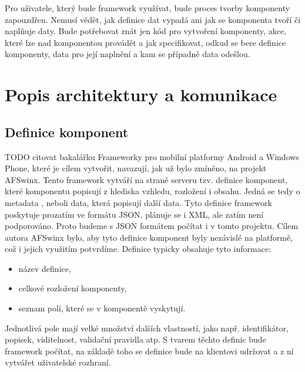 Pro uživatele, který bude framework využívat, bude proces tvorby komponenty zapouzdřen. Nemusí vědět, jak definice dat vypadá ani jak se komponenta tvoří či naplňuje daty. Bude potřebovat znát jen kód pro vytvoření komponenty, akce, které lze nad komponentou provádět a jak specifikovat, odkud se bere definice komponenty, data pro její naplnění a kam se případně data odešlou.

\section{Popis architektury a komunikace}
\subsection{Definice komponent}
TODO citovat bakalářku
Frameworky pro mobilní platformy Android a Windows Phone, které je cílem vytvořit, navazují, jak už bylo zmíněno, na projekt AFSwinx. Tento framework vytváří na straně serveru tzv. definice komponent, které komponentu popisují z hlediska vzhledu, rozložení i obsahu. Jedná se tedy o metadata \cite{https://en.wikipedia.org/wiki/Metadata}, neboli data, která popisují další data. Tyto definice framework poskytuje prozatím ve formátu JSON, plánuje se i XML, ale zatím není podporováno. Proto budeme s JSON formátem počítat i v tomto projektu. Cílem autora AFSwinx bylo, aby tyto definice komponent byly nezávislé na platformě, což i jejich využitím potvrdíme.
Definice typicky obsahuje tyto informace:
\begin{itemize}
\item název definice,
\item celkové rozložení komponenty,
\item seznam polí, které se v komponentě vyskytují.
\end{itemize}
Jednotlivá pole mají velké množství dalších vlastností, jako např. identifikátor, popisek, viditelnost, validační pravidla atp. S tvarem těchto definic bude framework počítat, na základě toho se definice bude na klientovi udržovat a z ní vytvářet uživatelské rozhraní. 

